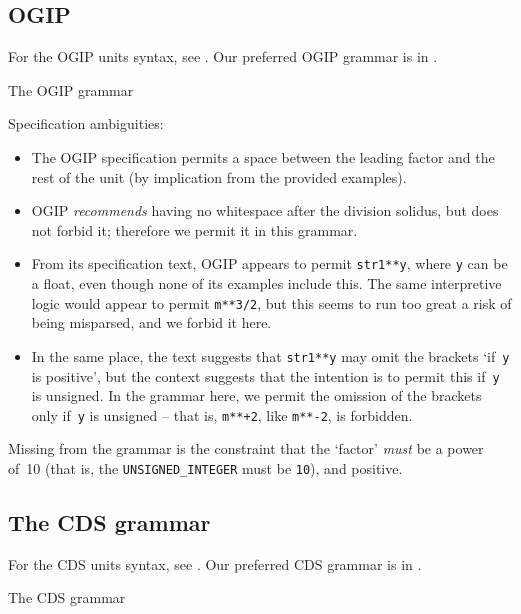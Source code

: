 \documentclass[12pt,notitlepage,onecolumn]{ivoa}
\begin{document}
\subsection{OGIP}
\label{sec:ogipgrammar}

For the OGIP units syntax, see \cite{george95}.  Our preferred OGIP
grammar is in .

\begin{table}

\caption{\label{tabx:ogipgrammar}The OGIP grammar}
\end{table}

Specification ambiguities:
\begin{itemize}
\item The OGIP specification permits a space between the leading
  factor and the rest of the unit (by implication from the provided
  examples).
\item OGIP \emph{recommends} having no whitespace after the division
  solidus, but does not forbid it; therefore we permit it in this
  grammar.
\item From its specification text, OGIP appears to permit
  \texttt{str1**y}, where \texttt{y} can be a float, even though none
  of its examples include this.  The same interpretive logic would
  appear to permit \texttt{m**3/2}, but this seems to run too great a
  risk of being misparsed, and we forbid it here.
\item In the same place, the text suggests that \texttt{str1**y} may
  omit the brackets `if~\texttt y is positive', but the context
  suggests that the intention is to permit this if~\texttt y is
  unsigned.  In the grammar here, we permit the omission of the
  brackets only if~\texttt y is unsigned -- that is, \texttt{m**+2},
  like \texttt{m**-2}, is forbidden.
\end{itemize}
Missing from the grammar is the constraint that the `factor'
\emph{must} be a power of~10 (that is, the \texttt{UNSIGNED\_INTEGER}
must be \texttt{10}), and positive.

\subsection{The CDS grammar}
\label{sec:cdsgrammar}

For the CDS units syntax, see \cite[\S3.2]{cds00}.  Our preferred CDS
grammar is in .

\begin{table}

\caption{\label{tabx:cdsgrammar}The CDS grammar}
\end{table}
\end{document}
